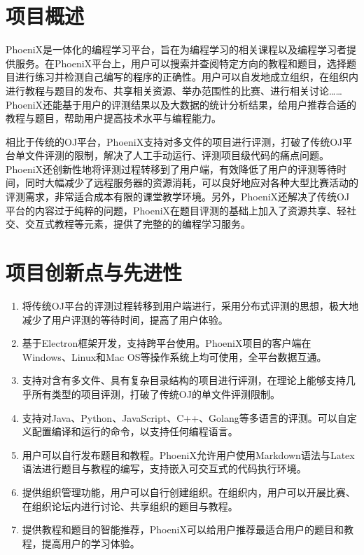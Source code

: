\section{项目概述}

PhoeniX是一体化的编程学习平台，旨在为编程学习的相关课程以及编程学习者提供服务。在PhoeniX平台上，用户可以搜索并查阅特定方向的教程和题目，选择题目进行练习并检测自己编写的程序的正确性。用户可以自发地成立组织，在组织内进行教程与题目的发布、共享相关资源、举办范围性的比赛、进行相关讨论……PhoeniX还能基于用户的评测结果以及大数据的统计分析结果，给用户推荐合适的教程与题目，帮助用户提高技术水平与编程能力。

相比于传统的OJ平台，PhoeniX支持对多文件的项目进行评测，打破了传统OJ平台单文件评测的限制，解决了人工手动运行、评测项目级代码的痛点问题。PhoeniX还创新性地将评测过程转移到了用户端，有效降低了用户的评测等待时间，同时大幅减少了远程服务器的资源消耗，可以良好地应对各种大型比赛活动的评测需求，非常适合成本有限的课堂教学环境。另外，PhoeniX还解决了传统OJ平台的内容过于纯粹的问题，PhoeniX在题目评测的基础上加入了资源共享、轻社交、交互式教程等元素，提供了完整的的编程学习服务。

\section{项目创新点与先进性}

\begin{enumerate}
    \item 将传统OJ平台的评测过程转移到用户端进行，采用分布式评测的思想，极大地减少了用户评测的等待时间，提高了用户体验。
    \item 基于Electron框架开发，支持跨平台使用。PhoeniX项目的客户端在Windows、Linux和Mac OS等操作系统上均可使用，全平台数据互通。
    \item 支持对含有多文件、具有复杂目录结构的项目进行评测，在理论上能够支持几乎所有类型的项目评测，打破了传统OJ的单文件评测限制。
    \item 支持对Java、Python、JavaScript、C++、Golang等多语言的评测。可以自定义配置编译和运行的命令，以支持任何编程语言。
    \item 用户可以自行发布题目和教程。PhoeniX允许用户使用Markdown语法与Latex语法进行题目与教程的编写，支持嵌入可交互式的代码执行环境。
    \item 提供组织管理功能，用户可以自行创建组织。在组织内，用户可以开展比赛、在组织论坛内进行讨论、共享组织的题目与教程。
    \item 提供教程和题目的智能推荐，PhoeniX可以给用户推荐最适合用户的题目和教程，提高用户的学习体验。
\end{enumerate}

